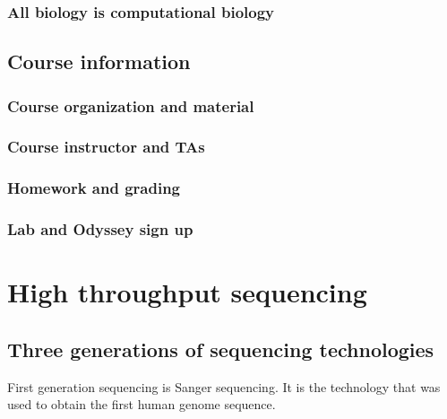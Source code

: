 \documentclass[]{book}
\begin{document}
\hypertarget{all-biology-is-computational-biology}{%
\subsection{All biology is computational biology}\label{all-biology-is-computational-biology}}

\hypertarget{course-information-1}{%
\section{Course information}\label{course-information-1}}

\hypertarget{course-organization-and-material}{%
\subsection{Course organization and material}\label{course-organization-and-material}}

\hypertarget{course-instructor-and-tas}{%
\subsection{Course instructor and TAs}\label{course-instructor-and-tas}}

\hypertarget{homework-and-grading}{%
\subsection{Homework and grading}\label{homework-and-grading}}

\hypertarget{lab-and-odyssey-sign-up}{%
\subsection{Lab and Odyssey sign up}\label{lab-and-odyssey-sign-up}}

\hypertarget{ngs}{%
\chapter{High throughput sequencing}\label{ngs}}

\hypertarget{three-generations-of-sequencing-technologies}{%
\section{Three generations of sequencing technologies}\label{three-generations-of-sequencing-technologies}}

First generation sequencing is Sanger sequencing. It is the technology that was used to obtain the first human genome sequence.
\end{document}
